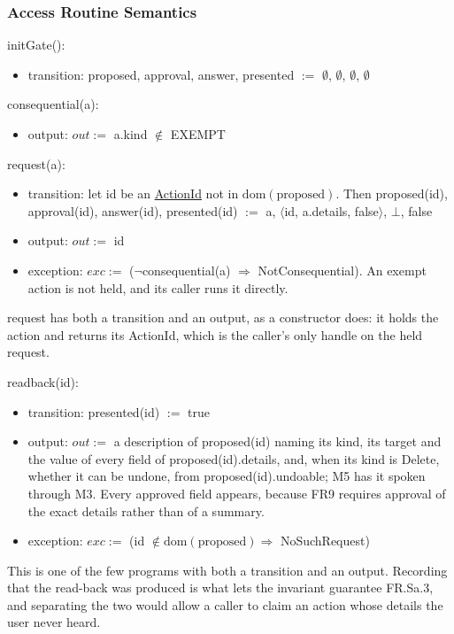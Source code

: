 \documentclass[12pt, titlepage]{article}
\newcommand{\nil}{\bot}
\begin{document}
\subsubsection{Access Routine Semantics}

\noindent initGate():
\begin{itemize}
\item transition: proposed, approval, answer, presented $:=$ $\emptyset$,
$\emptyset$, $\emptyset$, $\emptyset$
\end{itemize}

\noindent consequential(a):
\begin{itemize}
\item output: $out :=$ a.kind $\notin$ EXEMPT
\end{itemize}

\noindent request(a):
\begin{itemize}
\item transition: let id be an \hyperref[type:ActionId]{ActionId} not in
$\mathrm{dom}(\text{proposed})$. Then proposed(id), approval(id), answer(id),
presented(id) $:=$ a, $\langle$id, a.details, false$\rangle$, $\nil$, false
\item output: $out :=$ id
\item exception: $exc :=$ ($\lnot$consequential(a) $\Rightarrow$
NotConsequential). An exempt action is not held, and its caller runs it
directly.
\end{itemize}

\noindent request has both a transition and an output, as a constructor does: it
holds the action and returns its ActionId, which is the caller's only handle on
the held request.

\noindent readback(id):
\begin{itemize}
\item transition: presented(id) $:=$ true
\item output: $out :=$ a description of proposed(id) naming its kind, its target
and the value of every field of proposed(id).details, and, when its kind is
Delete, whether it can be undone, from proposed(id).undoable; M5 has it spoken
through M3. Every
approved field appears, because FR9 requires approval of the exact details
rather than of a summary.
\item exception: $exc :=$ (id $\notin \mathrm{dom}(\text{proposed}) \Rightarrow$
NoSuchRequest)
\end{itemize}

\noindent This is one of the few programs with both a transition and an output.
Recording that the read-back was produced is what lets the invariant guarantee
FR.Sa.3, and separating the two would allow a caller to claim an action whose
details the user never heard.
\end{document}
